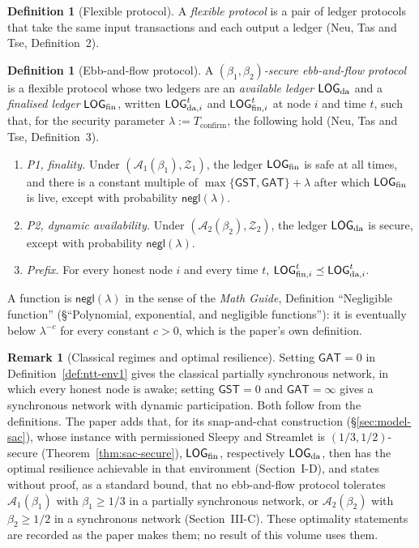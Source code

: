 \documentclass[11pt,a4paper]{article}
\theoremstyle{definition}
\newtheorem{definition}[theorem]{Definition}
\newtheorem{remark}[theorem]{Remark}
\newcommand{\negl}{\mathsf{negl}}
\newcommand{\Adv}{\mathcal{A}}
\newcommand{\GST}{\mathsf{GST}}
\newcommand{\GAT}{\mathsf{GAT}}
\newcommand{\Tconfirm}{T_{\mathrm{confirm}}}
\newcommand{\Env}{\mathcal{Z}}
\begin{document}
\begin{definition}[Flexible protocol]\label{def:ntt-flexible}
A \emph{flexible protocol} is a pair of ledger protocols that take the same
input transactions and each output a ledger (Neu, Tas and Tse,
Definition~2).
\end{definition}

\begin{definition}[Ebb-and-flow protocol]\label{def:ntt-ebbflow}
A \emph{$(\beta_1, \beta_2)$-secure ebb-and-flow protocol} is a flexible
protocol whose two ledgers are an \emph{available ledger} $\LOGda$ and a
\emph{finalised ledger} $\LOGfin$, written $\LOGda[i]^t$ and $\LOGfin[i]^t$
at node $i$ and time $t$, such that, for the security parameter
$\lambda := \Tconfirm$, the following hold (Neu, Tas and Tse,
Definition~3).
\begin{enumerate}[label=(\roman*)]
\item \emph{P1, finality.} Under $(\Adv_1(\beta_1), \Env_1)$, the ledger
  $\LOGfin$ is safe at all times, and there is a constant multiple of
  $\max\{\GST, \GAT\} + \lambda$ after which $\LOGfin$ is live, except with
  probability $\negl(\lambda)$.
\item \emph{P2, dynamic availability.} Under $(\Adv_2(\beta_2), \Env_2)$,
  the ledger $\LOGda$ is secure, except with probability $\negl(\lambda)$.
\item \emph{Prefix.} For every honest node $i$ and every time $t$,
  $\LOGfin[i]^t \preceq \LOGda[i]^t$.
\end{enumerate}
A function is $\negl(\lambda)$ in the sense of the \emph{Math Guide},
Definition ``Negligible function'' (\S``Polynomial, exponential, and
negligible functions''): it is eventually below $\lambda^{-c}$ for every
constant $c > 0$, which is the paper's own definition.
\end{definition}

\begin{remark}[Classical regimes and optimal resilience]
\label{rem:ntt-extremes}
Setting $\GAT = 0$ in Definition~\ref{def:ntt-env1} gives the classical
partially synchronous network, in which every honest node is awake; setting
$\GST = 0$ and $\GAT = \infty$ gives a synchronous network with dynamic
participation. Both follow from the definitions. The paper adds that, for
its snap-and-chat construction (\S\ref{sec:model-sac}), whose instance with
permissioned Sleepy and Streamlet is $(1/3, 1/2)$-secure
(Theorem~\ref{thm:sac-secure}), $\LOGfin$, respectively $\LOGda$, then has
the optimal resilience achievable in that environment (Section~I-D), and
states without proof, as a standard bound, that no ebb-and-flow protocol
tolerates $\Adv_1(\beta_1)$ with $\beta_1 \ge 1/3$ in a partially synchronous
network, or $\Adv_2(\beta_2)$ with $\beta_2 \ge 1/2$ in a synchronous network
(Section~III-C). These
optimality statements are recorded as the paper makes them; no result of
this volume uses them.
\end{remark}
\end{document}
